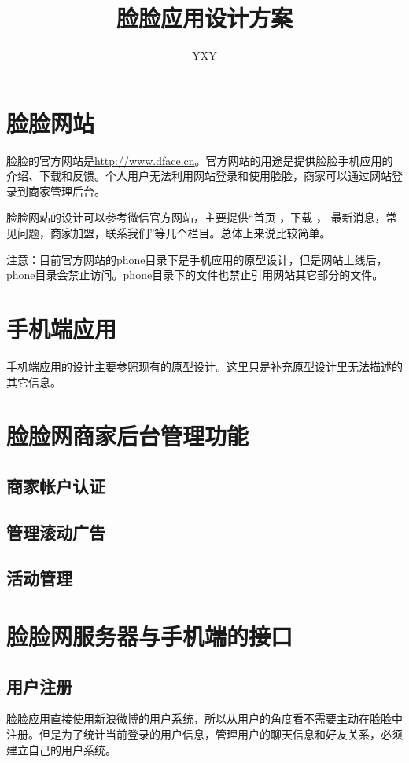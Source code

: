 \documentclass{article}
\author{YXY}
\title{脸脸应用设计方案}
\begin{document}
\begin{CJK}{UTF8}{gbsn}

\maketitle
\tableofcontents

\section{脸脸网站}
脸脸的官方网站是\href{http://www.dface.cn}{http://www.dface.cn}。官方网站的用途是提供脸脸手机应用的介绍、下载和反馈。个人用户无法利用网站登录和使用脸脸，商家可以通过网站登录到商家管理后台。


脸脸网站的设计可以参考微信官方网站，主要提供“首页 ，下载 ， 最新消息，常见问题，商家加盟，联系我们”等几个栏目。总体上来说比较简单。


注意：目前官方网站的phone目录下是手机应用的原型设计，但是网站上线后，phone目录会禁止访问。phone目录下的文件也禁止引用网站其它部分的文件。


\section{手机端应用}
手机端应用的设计主要参照现有的原型设计。这里只是补充原型设计里无法描述的其它信息。


\section{脸脸网商家后台管理功能}
\subsection{商家帐户认证}
\subsection{管理滚动广告}
\subsection{活动管理}





\section{脸脸网服务器与手机端的接口}
\subsection{用户注册}
脸脸应用直接使用新浪微博的用户系统，所以从用户的角度看不需要主动在脸脸中注册。但是为了统计当前登录的用户信息，管理用户的聊天信息和好友关系，必须建立自己的用户系统。


\end{CJK}
\end{document}

